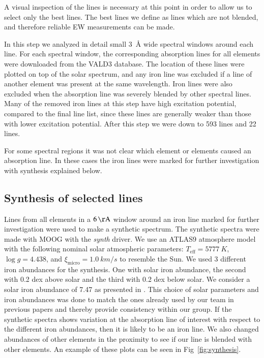 \documentclass{aa}
\begin{document}
A visual inspection of the lines is necessary at this point in order
to allow us to select only the best lines. The best lines we define as
lines which are not blended, and therefore reliable EW measurements can
be made.

In this step we analyzed in detail small \SI{3}{\angstrom} wide spectral
windows around each line. For each spectral window, the corresponding
absorption lines for all elements were downloaded from the VALD3
database. The location of these lines were plotted on top of the solar
spectrum, and any iron line was excluded if a line of another element
was present at the same wavelength. Iron lines were also excluded when
the absorption line was severely blended by other spectral lines. Many
of the removed iron lines at this step have high excitation potential,
compared to the final line list, since these lines are generally weaker
than those with lower excitation potential. After this step we were down
to 593  lines and 22  lines.

For some spectral regions it was not clear which element or elements
caused an absorption line. In these cases the iron lines were marked for
further investigation with synthesis explained below.


\subsection{Synthesis of selected lines}
\label{sub:synthesis_of_selected_lines}

Lines from all elements in a $\SI{6}{\AA}$ window around an iron line
marked for further investigation were used to make a synthetic spectrum.
The synthetic spectra were made with MOOG with the \emph{synth} driver.
We use an ATLAS9 atmosphere model \citep{Kurucz1993} with the following
nominal solar atmospheric parameters: $T_\mathrm{eff}=\SI{5777}{K}$,
$\log g = 4.438$, and $\xi_\mathrm{micro} = \SI{1.0}{km/s}$ to resemble
the Sun. We used 3 different iron abundances for the synthesis. One with
solar iron abundance, the second with 0.2 dex above solar and the third
with 0.2 dex below solar. We consider a solar iron abundance of 7.47 as
presented in \cite{Gonzalez2000}. This choice of solar parameters and
iron abundances was done to match the ones already used by our team in
previous papers \citep[see e.g.][and references therein]{Santos13} and
thereby provide consistency within our group. If the synthetic spectra
shows variation at the absorption line of interest with respect to the
different iron abundances, then it is likely to be an iron line. We also
changed abundances of other elements in the proximity to see if our line
is blended with other elements. An example of these plots can be seen in
Fig~\ref{fig:synthesis}.
\end{document}
